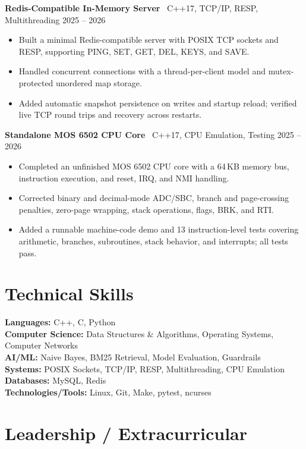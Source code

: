 \documentclass[letterpaper,10pt]{article}
\begin{document}
\textbf{Redis-Compatible In-Memory Server} \textbar\ C++17, TCP/IP, RESP, Multithreading \hfill 2025 -- 2026
\begin{itemize}
  \item Built a minimal Redis-compatible server with POSIX TCP sockets and RESP, supporting PING, SET, GET, DEL, KEYS, and SAVE.
  \item Handled concurrent connections with a thread-per-client model and mutex-protected unordered map storage.
  \item Added automatic snapshot persistence on writes and startup reload; verified live TCP round trips and recovery across restarts.
\end{itemize}

\textbf{Standalone MOS 6502 CPU Core} \textbar\ C++17, CPU Emulation, Testing \hfill 2025 -- 2026
\begin{itemize}
  \item Completed an unfinished MOS 6502 CPU core with a 64\,KB memory bus, instruction execution, and reset, IRQ, and NMI handling.
  \item Corrected binary and decimal-mode ADC/SBC, branch and page-crossing penalties, zero-page wrapping, stack operations, flags, BRK, and RTI.
  \item Added a runnable machine-code demo and 13 instruction-level tests covering arithmetic, branches, subroutines, stack behavior, and interrupts; all tests pass.
\end{itemize}

\section*{Technical Skills}
\textbf{Languages:} C++, C, Python\\
\textbf{Computer Science:} Data Structures \& Algorithms, Operating Systems, Computer Networks\\
\textbf{AI/ML:} Naive Bayes, BM25 Retrieval, Model Evaluation, Guardrails\\
\textbf{Systems:} POSIX Sockets, TCP/IP, RESP, Multithreading, CPU Emulation\\
\textbf{Databases:} MySQL, Redis\\
\textbf{Technologies/Tools:} Linux, Git, Make, pytest, ncurses

\section*{Leadership / Extracurricular}
\end{document}
